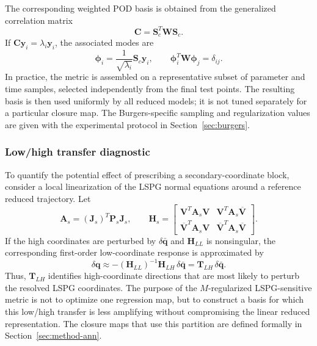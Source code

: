 \documentclass[11pt]{article}
\begin{document}
The corresponding weighted POD basis is obtained from the generalized
correlation matrix
\begin{equation}
\mathbf C
=
\mathbf S_c^T\mathbf W\mathbf S_c .
\label{eq:mlspg-correlation}
\end{equation}
If $\mathbf C\mathbf y_i=\lambda_i\mathbf y_i$, the associated
modes are
\begin{equation}
\bm\phi_i
=
\frac{1}{\sqrt{\lambda_i}}\mathbf S_c\mathbf y_i,
\qquad
\bm\phi_i^T\mathbf W\bm\phi_j=\delta_{ij}.
\label{eq:weighted-pod-modes}
\end{equation}
In practice, the metric is assembled on a representative subset of parameter
and time samples, selected independently from the final test points. The
resulting basis is then used uniformly by all reduced models; it is not tuned
separately for a particular closure map.  The Burgers-specific sampling and
regularization values are given with the experimental protocol in
Section~\ref{sec:burgers}.

\subsubsection{Low/high transfer diagnostic}
To quantify the potential effect of prescribing a secondary-coordinate block,
consider a local linearization of the LSPG normal equations around a reference
reduced trajectory. Let
\begin{equation}
\mathbf A_s=(\mathbf J_s)^T\mathbf P_s\mathbf J_s,
\qquad
\mathbf H_s=
\begin{bmatrix}
\mathbf V^T\mathbf A_s\mathbf V
&
\mathbf V^T\mathbf A_s\overline{\mathbf V}
\\
\overline{\mathbf V}^T\mathbf A_s\mathbf V
&
\overline{\mathbf V}^T\mathbf A_s\overline{\mathbf V}
\end{bmatrix}.
\end{equation}
If the high coordinates are perturbed by $\delta\bar{\mathbf q}$ and
$\mathbf H_{LL}$ is nonsingular, the corresponding first-order low-coordinate
response is approximated by
\begin{equation}
\delta\mathbf q
\approx
-
\left(\mathbf H_{LL}\right)^{-1}\mathbf H_{LH}\,\delta\bar{\mathbf q}
=
\mathbf T_{LH}\,\delta\bar{\mathbf q}.
\label{eq:low-high-transfer}
\end{equation}
Thus, $\mathbf T_{LH}$ identifies high-coordinate directions that are most
likely to perturb the resolved LSPG coordinates. The purpose of the
$M$-regularized LSPG-sensitive metric is not to optimize one regression map,
but to construct a basis for which this low/high transfer is less amplifying
without compromising the linear reduced representation. The closure maps that
use this partition are defined formally in Section~\ref{sec:method-ann}.
\end{document}
